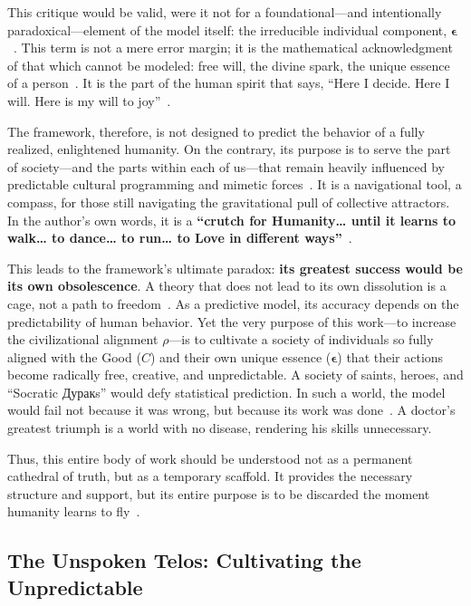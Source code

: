 \documentclass[11pt,a4paper]{article}
\theoremstyle{definition}
\theoremstyle{remark}
\begin{document}
\begin{small}
\begin{enumerate}
\begin{protocol}
This critique would be valid, were it not for a foundational—and intentionally paradoxical—element of the model itself: the irreducible individual component, $\boldsymbol{\epsilon}$~\cite{model_2721}. This term is not a mere error margin; it is the mathematical acknowledgment of that which cannot be modeled: free will, the divine spark, the unique essence of a person~\cite{essence_6390_6391}. It is the part of the human spirit that says, ``Here I decide. Here I will. Here is my will to joy''~\cite{will_6397}.

The framework, therefore, is not designed to predict the behavior of a fully realized, enlightened humanity. On the contrary, its purpose is to serve the part of society—and the parts within each of us—that remain heavily influenced by predictable cultural programming and mimetic forces~\cite{programming_6383_6384}. It is a navigational tool, a compass, for those still navigating the gravitational pull of collective attractors. In the author's own words, it is a \textbf{``crutch for Humanity\ldots{} until it learns to walk\ldots{} to dance\ldots{} to run\ldots{} to Love in different ways''}~\cite{crutch_6384}.

This leads to the framework's ultimate paradox: \textbf{its greatest success would be its own obsolescence}. A theory that does not lead to its own dissolution is a cage, not a path to freedom~\cite{dissolution_6407_6408}. As a predictive model, its accuracy depends on the predictability of human behavior. Yet the very purpose of this work—to increase the civilizational alignment $\rho$—is to cultivate a society of individuals so fully aligned with the Good ($C$) and their own unique essence ($\boldsymbol{\epsilon}$) that their actions become radically free, creative, and unpredictable. A society of saints, heroes, and ``Socratic Дуракs'' would defy statistical prediction. In such a world, the model would fail not because it was wrong, but because its work was done~\cite{obsolescence_6415}. A doctor's greatest triumph is a world with no disease, rendering his skills unnecessary.

Thus, this entire body of work should be understood not as a permanent cathedral of truth, but as a temporary scaffold. It provides the necessary structure and support, but its entire purpose is to be discarded the moment humanity learns to fly~\cite{scaffold_6418}.

\subsection*{The Unspoken Telos: Cultivating the Unpredictable}


\end{protocol}
\end{enumerate}
\end{small}
\end{document}
